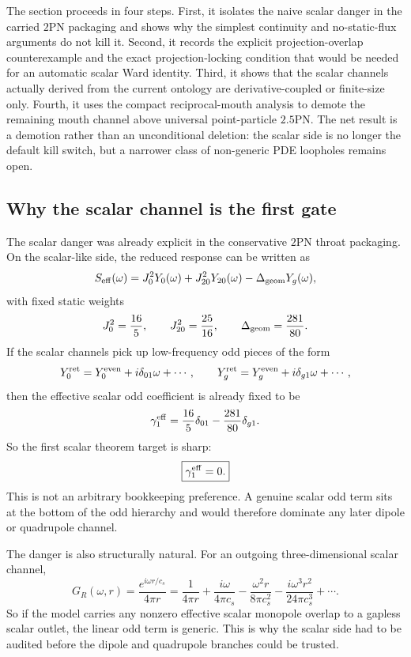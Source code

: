 \documentclass[11pt]{article}
\begin{document}
The section proceeds in four steps.  First, it isolates the naive scalar danger
in the carried $2$PN packaging and shows why the simplest continuity and
no-static-flux arguments do not kill it.  Second, it records the explicit
projection-overlap counterexample and the exact projection-locking condition that
would be needed for an automatic scalar Ward identity.  Third, it shows that the
scalar channels actually derived from the current ontology are derivative-coupled
or finite-size only.  Fourth, it uses the compact reciprocal-mouth analysis to
demote the remaining mouth channel above universal point-particle $2.5$PN.  The
net result is a demotion rather than an unconditional deletion: the scalar side
is no longer the default kill switch, but a narrower class of non-generic PDE
loopholes remains open.

\subsection{Why the scalar channel is the first gate}
\label{sec:scalar-audit-first-gate}

The scalar danger was already explicit in the conservative $2$PN throat
packaging.  On the scalar-like side, the reduced response can be written as
\[
S_{\rm eff}(\omega)
=
J_0^2Y_0(\omega)+J_{20}^2Y_{20}(\omega)-\Delta_{\rm geom}Y_g(\omega),
\]
with fixed static weights
\[
J_0^2=\frac{16}{5},
\qquad
J_{20}^2=\frac{25}{16},
\qquad
\Delta_{\rm geom}=\frac{281}{80}.
\]
If the scalar channels pick up low-frequency odd pieces of the form
\[
Y_0^{\rm ret}=Y_0^{\rm even}+i\delta_{01}\omega+\cdots,
\qquad
Y_g^{\rm ret}=Y_g^{\rm even}+i\delta_{g1}\omega+\cdots,
\]
then the effective scalar odd coefficient is already fixed to be
\[
\gamma_1^{\rm eff}
=
\frac{16}{5}\delta_{01}
-
\frac{281}{80}\delta_{g1}.
\]
So the first scalar theorem target is sharp:
\[
\boxed{\gamma_1^{\rm eff}=0.}
\]
This is not an arbitrary bookkeeping preference.  A genuine scalar odd term sits
at the bottom of the odd hierarchy and would therefore dominate any later dipole
or quadrupole channel.

The danger is also structurally natural.  For an outgoing three-dimensional
scalar channel,
\[
G_R(\omega,r)
=
\frac{e^{i\omega r/c_s}}{4\pi r}
=
\frac{1}{4\pi r}
+
\frac{i\omega}{4\pi c_s}
-
\frac{\omega^2 r}{8\pi c_s^2}
-
\frac{i\omega^3r^2}{24\pi c_s^3}
+\cdots.
\]
So if the model carries any nonzero effective scalar monopole overlap to a
gapless scalar outlet, the linear odd term is generic.  This is why the scalar
side had to be audited before the dipole and quadrupole branches could be
trusted.
\end{document}
